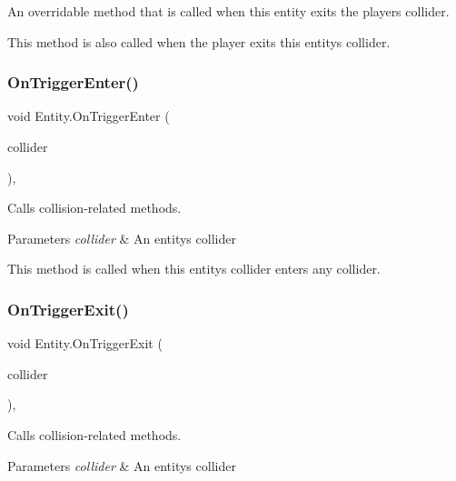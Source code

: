 An overridable method that is called when this entity exits the player\textquotesingle{}s collider. 

This method is also called when the player exits this entity\textquotesingle{}s collider. \mbox{\label{class_entity_ad869135bb5e08171e05904f728eed062}} 
\subsubsection{\texorpdfstring{On\+Trigger\+Enter()}{OnTriggerEnter()}}
{\footnotesize\ttfamily void Entity.\+On\+Trigger\+Enter (\begin{DoxyParamCaption}\item[{Collider}]{collider }\end{DoxyParamCaption})\hspace{0.3cm}{\ttfamily [inline]}, {\ttfamily [protected]}}



Calls collision-\/related methods. 


\begin{DoxyParams}{Parameters}
{\em collider} & An entity\textquotesingle{}s collider \\
\hline
\end{DoxyParams}


This method is called when this entity\textquotesingle{}s collider enters any collider. \mbox{\label{class_entity_a430f39e3987d6ae36bd62ed78f02fa2c}} 
\subsubsection{\texorpdfstring{On\+Trigger\+Exit()}{OnTriggerExit()}}
{\footnotesize\ttfamily void Entity.\+On\+Trigger\+Exit (\begin{DoxyParamCaption}\item[{Collider}]{collider }\end{DoxyParamCaption})\hspace{0.3cm}{\ttfamily [inline]}, {\ttfamily [protected]}}



Calls collision-\/related methods. 


\begin{DoxyParams}{Parameters}
{\em collider} & An entity\textquotesingle{}s collider \\
\hline
\end{DoxyParams}


